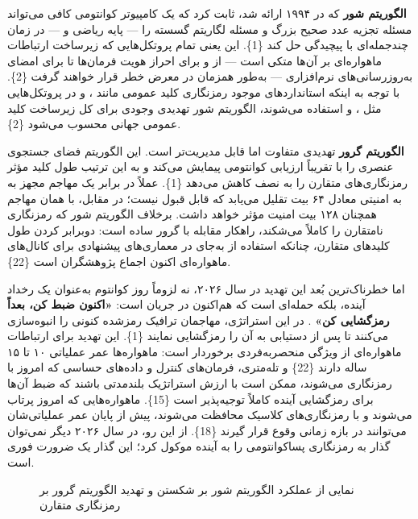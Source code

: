 \documentclass[a4paper,14pt]{extreport}
\begin{document}
\textbf{الگوریتم شور } که در ۱۹۹۴ ارائه شد، ثابت کرد که یک کامپیوتر کوانتومی کافی می‌تواند مسئله تجزیه عدد صحیح بزرگ و مسئله لگاریتم گسسته را — پایه ریاضی  و  — در زمان چندجمله‌ای  با پیچیدگی  حل کند \{1\}. این یعنی تمام پروتکل‌هایی که زیرساخت ارتباطات ماهواره‌ای بر آن‌ها متکی است — از  و  برای احراز هویت فرمان‌ها تا  برای امضای به‌روزرسانی‌های نرم‌افزاری — به‌طور همزمان در معرض خطر قرار خواهند گرفت \{2\}. با توجه به اینکه استانداردهای موجود رمزنگاری کلید عمومی مانند ،  و  در پروتکل‌هایی مثل ،  و  استفاده می‌شوند، الگوریتم شور تهدیدی وجودی برای کل زیرساخت کلید عمومی  جهانی محسوب می‌شود \{2\}.

\textbf{الگوریتم گرور } تهدیدی متفاوت اما قابل مدیریت‌تر است. این الگوریتم فضای جستجوی  عنصری را با تقریباً  ارزیابی کوانتومی پیمایش می‌کند و به این ترتیب طول کلید مؤثر رمزنگاری‌های متقارن را به نصف کاهش می‌دهد \{1\}. عملاً  در برابر یک مهاجم مجهز به  به امنیتی معادل ۶۴ بیت تقلیل می‌یابد که قابل قبول نیست؛ در مقابل،  با همان مهاجم همچنان ۱۲۸ بیت امنیت مؤثر خواهد داشت. برخلاف الگوریتم شور که رمزنگاری نامتقارن را کاملاً می‌شکند، راهکار مقابله با گرور ساده است: دوبرابر کردن طول کلیدهای متقارن، چنانکه استفاده از  به‌جای  در معماری‌های پیشنهادی برای کانال‌های ماهواره‌ای اکنون اجماع پژوهشگران است \{22\}.

اما خطرناک‌ترین بُعد این تهدید در سال ۲۰۲۶، نه لزوماً روز کوانتوم  به‌عنوان یک رخداد آینده، بلکه حمله‌ای است که هم‌اکنون در جریان است: \textbf{«اکنون ضبط کن، بعداً رمزگشایی کن»} . در این استراتژی، مهاجمان ترافیک رمزشده کنونی را انبوه‌سازی می‌کنند تا پس از دستیابی به  آن را رمزگشایی نمایند \{1\}. این تهدید برای ارتباطات ماهواره‌ای از ویژگی منحصربه‌فردی برخوردار است: ماهواره‌ها عمر عملیاتی ۱۰ تا ۱۵ ساله دارند \{22\} و تله‌متری، فرمان‌های کنترل و داده‌های حساسی که امروز با  رمزنگاری می‌شوند، ممکن است با ارزش استراتژیک بلندمدتی باشند که ضبط آن‌ها برای رمزگشایی آینده کاملاً توجیه‌پذیر است \{15\}. ماهواره‌هایی که امروز پرتاب می‌شوند و با رمزنگاری‌های کلاسیک محافظت می‌شوند، پیش از پایان عمر عملیاتی‌شان می‌توانند در بازه زمانی وقوع  قرار گیرند \{18\}. از این رو، در سال ۲۰۲۶ دیگر نمی‌توان گذار به رمزنگاری پساکوانتومی را به آینده موکول کرد؛ این گذار یک ضرورت فوری است.

\begin{figure}[H]
\centering
{}
\caption{نمایی از عملکرد الگوریتم شور  بر شکستن  و تهدید الگوریتم گرور  بر رمزنگاری متقارن}
\label{fig:2-2}
\end{figure}
\end{document}
